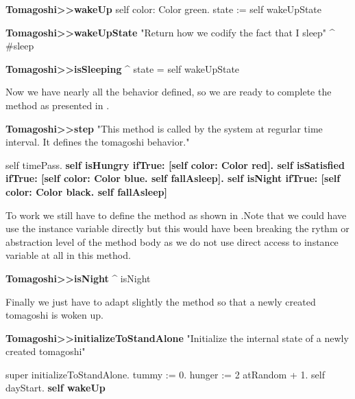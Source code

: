 \begin{method}\label{mth:wakeUp}
\textbf{Tomagoshi>>wakeUp}
   self color: Color green.
   state := self wakeUpState
\end{method}

\begin{method}\label{mth:wakeUpState}
\textbf{Tomagoshi>>wakeUpState}
  "Return how we codify the fact that I sleep"
   ^ #sleep
\end{method}

\begin{method}\label{mth:isSleeping}
\textbf{Tomagoshi>>isSleeping}
   ^ state = self wakeUpState
\end{method}

Now we have nearly all the behavior defined, so we are ready to complete the method  as presented in .

\begin{method}\label{mth:stepTwo}
\textbf{Tomagoshi>>step}
  "This method is called by the system at regurlar time interval.
   It defines the tomagoshi behavior."

   self timePass.
   \textbf{self isHungry
      ifTrue: [self color: Color red].
   self isSatisfied
      ifTrue: 
         [self color: Color blue.
         self fallAsleep].
   self isNight 
      ifTrue: 
         [self color: Color black. 
         self fallAsleep]}
\end{method}

To work we still have to define the method  as shown in .Note that we could have use the instance variable
 directly but this would have been breaking the rythm or abstraction level of the  method body as we do not use direct access to instance variable at all in this method. 

\begin{method}\label{mth:isNight}
\textbf{Tomagoshi>>isNight}
   ^ isNight
\end{method}

Finally we just have to adapt slightly the  method so that a newly created tomagoshi is woken up. 

\begin{method}\label{mth:InitializeThree}
\textbf{Tomagoshi>>initializeToStandAlone}
    "Initialize the internal state of a newly created tomagoshi"

   super initializeToStandAlone.
   tummy := 0.
   hunger := 2 atRandom + 1.
   self dayStart.
   \textbf{self wakeUp}
\end{method}

